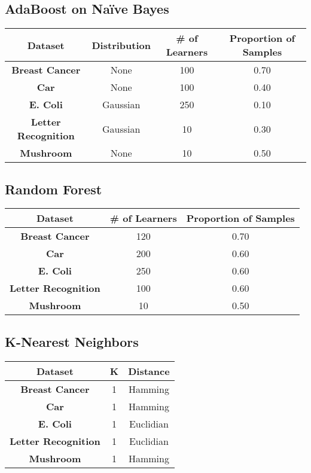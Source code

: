 \documentclass[11pt]{article}
\newcommand{\bb}{\textbf}
\begin{document}
\subsection{AdaBoost on Naïve Bayes}
\begin{tabular}{ |c|c|c|c| } \hline
  \bb{Dataset}            & \bb{Distribution} & \bb{\# of Learners} & \bb{Proportion of Samples} \\ \hline
  \bb{Breast Cancer}      & None              & 100                 & 0.70                       \\ \hline
  \bb{Car}                & None              & 100                 & 0.40                       \\ \hline
  \bb{E. Coli}            & Gaussian          & 250                 & 0.10                       \\ \hline
  \bb{Letter Recognition} & Gaussian          & 10                  & 0.30                       \\ \hline
  \bb{Mushroom}           & None              & 10                  & 0.50                       \\ \hline
\end{tabular}

\subsection{Random Forest}
\begin{tabular}{ |c|c|c| } \hline
  \bb{Dataset}            & \bb{\# of Learners} & \bb{Proportion of Samples} \\ \hline
  \bb{Breast Cancer}      & 120                 & 0.70                       \\ \hline
  \bb{Car}                & 200                 & 0.60                       \\ \hline
  \bb{E. Coli}            & 250                 & 0.60                       \\ \hline
  \bb{Letter Recognition} & 100                 & 0.60                       \\ \hline
  \bb{Mushroom}           & 10                  & 0.50                       \\ \hline
\end{tabular}

\subsection{K-Nearest Neighbors}
\begin{tabular}{ |c|c|c| } \hline
  \bb{Dataset}            & \bb{K} & Distance  \\ \hline
  \bb{Breast Cancer}      & 1      & Hamming   \\ \hline
  \bb{Car}                & 1      & Hamming   \\ \hline
  \bb{E. Coli}            & 1      & Euclidian \\ \hline
  \bb{Letter Recognition} & 1      & Euclidian \\ \hline
  \bb{Mushroom}           & 1      & Hamming   \\ \hline
\end{tabular}
\end{document}
